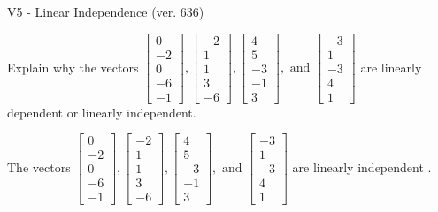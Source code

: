 \begin{exercise}
  \begin{exerciseTitle}V5 - Linear Independence (ver. 636)\end{exerciseTitle}
  \begin{exerciseStatement}
    Explain why the vectors \(\left[\begin{array}{r}
0 \\
-2 \\
0 \\
-6 \\
-1
\end{array}\right] , \left[\begin{array}{r}
-2 \\
1 \\
1 \\
3 \\
-6
\end{array}\right] , \left[\begin{array}{r}
4 \\
5 \\
-3 \\
-1 \\
3
\end{array}\right] , \text{ and } \left[\begin{array}{r}
-3 \\
1 \\
-3 \\
4 \\
1
\end{array}\right]\) are linearly dependent or linearly independent.	


  \end{exerciseStatement}
  \begin{exerciseAnswer}
   The vectors \(\left[\begin{array}{r}
0 \\
-2 \\
0 \\
-6 \\
-1
\end{array}\right] , \left[\begin{array}{r}
-2 \\
1 \\
1 \\
3 \\
-6
\end{array}\right] , \left[\begin{array}{r}
4 \\
5 \\
-3 \\
-1 \\
3
\end{array}\right] , \text{ and } \left[\begin{array}{r}
-3 \\
1 \\
-3 \\
4 \\
1
\end{array}\right]\) are 
  	 linearly independent  .
  


  \end{exerciseAnswer}
\end{exercise}